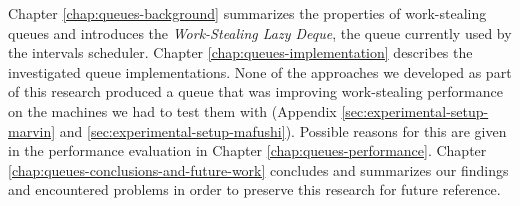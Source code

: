 Chapter \ref{chap:queues-background} summarizes the properties of
work-stealing queues and introduces the \emph{Work-Stealing Lazy
  Deque}, the queue currently used by the intervals scheduler. Chapter
\ref{chap:queues-implementation} describes the investigated queue
implementations. None of the approaches we developed as part of this
research produced a queue that was improving work-stealing performance
on the machines we had to test them with (Appendix
\ref{sec:experimental-setup-marvin} and
\ref{sec:experimental-setup-mafushi}). Possible reasons for this are
given in the performance evaluation in Chapter
\ref{chap:queues-performance}. Chapter
\ref{chap:queues-conclusions-and-future-work} concludes and summarizes
our findings and encountered problems in order to preserve this
research for future reference.


